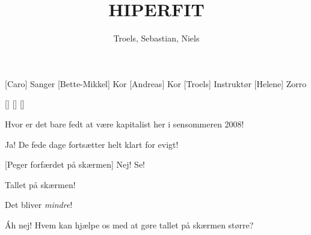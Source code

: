 \documentclass[a4paper,11pt]{article}
\title{HIPERFIT}
\author{Troels, Sebastian, Niels}
\begin{document}
\maketitle

\begin{roles}
[Caro] Sanger
[Bette-Mikkel] Kor
[Andreas] Kor
[Troels] Instruktør
[Helene] Zorro
\end{roles}

\begin{props}
[]
[]
[]
\end{props}

\begin{sketch}

   Hvor er det bare fedt at være kapitalist her i sensommeren
  2008!

   Ja!  De fede dage fortsætter helt klart for evigt!

  [Peger forfærdet på skærmen]  Nej!  Se!

   Tallet på skærmen!

   Det bliver \textit{mindre}!


   Áh nej!  Hvem kan hjælpe os med at gøre tallet på skærmen større?
\end{sketch}
\end{document}
